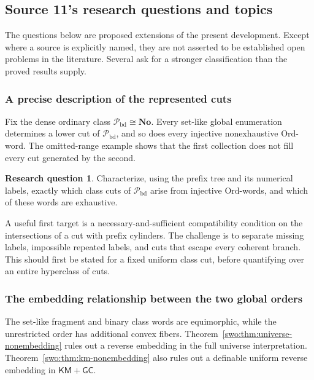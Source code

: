 \documentclass[11pt]{article}
\theoremstyle{definition}
\newtheorem{question}[question]{Research question}
\theoremstyle{remark}
\newcommand{\No}{\mathbf{No}}
\newcommand{\Ord}{\mathrm{Ord}}
\newcommand{\Pbd}{\mathcal P_{\mathrm{bd}}}
\newcommand{\KM}{\mathsf{KM}}
\newcommand{\GC}{\mathsf{GC}}
\begin{document}
\subsection{Source 11's research questions and topics}\label{swo:sec:research}

The questions below are proposed extensions of the present
development. Except where a source is explicitly named, they
are not asserted to be established open problems in the
literature. Several ask for a stronger classification than
the proved results supply.

\subsubsection{A precise description of the represented cuts}

Fix the dense ordinary class \(\Pbd\cong\No\). Every
set-like global enumeration determines a lower cut of
\(\Pbd\), and so does every injective nonexhaustive
\(\Ord\)-word. The omitted-range example shows that the
first collection does not fill every cut generated by the
second.

\begin{question}\label{swo:n16.1}
Characterize, using the prefix tree and its numerical
labels, exactly which class cuts of \(\Pbd\) arise from
injective \(\Ord\)-words, and which of these words are
exhaustive.
\end{question}

A useful first target is a necessary-and-sufficient
compatibility condition on the intersections of a cut with
prefix cylinders. The challenge is to separate missing
labels, impossible repeated labels, and cuts that escape
every coherent branch. This should first be stated for a
fixed uniform class cut, before quantifying over an entire
hyperclass of cuts.

\subsubsection{The embedding relationship between the two global orders}

The set-like fragment and binary class words are
equimorphic, while the unrestricted order has additional
convex fibers. Theorem~\ref{swo:thm:universe-nonembedding}
rules out a reverse embedding in the full universe
interpretation. Theorem~\ref{swo:thm:km-nonembedding} also
rules out a definable uniform reverse embedding in
\(\KM+\GC\).
\end{document}
